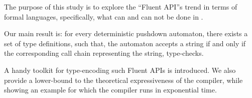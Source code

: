 The purpose of this study is to explore the ``Fluent API''s trend in
  terms of formal languages, specifically, what can and can not be done 
  in \Java.

Our main result is: for every deterministic pushdown automaton,
  there exists a set of \Java type definitions, such that,
  the automaton accepts a string if and only if the corresponding 
  call chain representing the string, type-checks.

A handy toolkit for type-encoding such Fluent APIs is introduced.
We also provide a lower-bound to the theoretical expressiveness of the \Java compiler,
  while showing an example for which the compiler runs in exponential time.
  
